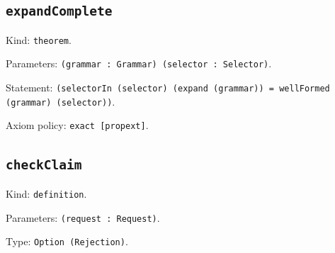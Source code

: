 \documentclass[11pt]{article}
\begin{document}
\subsection*{\texttt{expandComplete}}
\noindent Kind: \texttt{theorem}.\par
\noindent Parameters: \texttt{(grammar : Grammar) (selector : Selector)}.\par
\noindent Statement: \texttt{(selectorIn (selector) (expand (grammar)) = wellFormed (grammar) (selector))}.\par
\noindent Axiom policy: \texttt{exact [propext]}.\par
\subsection*{\texttt{checkClaim}}
\noindent Kind: \texttt{definition}.\par
\noindent Parameters: \texttt{(request : Request)}.\par
\noindent Type: \texttt{Option (Rejection)}.\par
\end{document}
